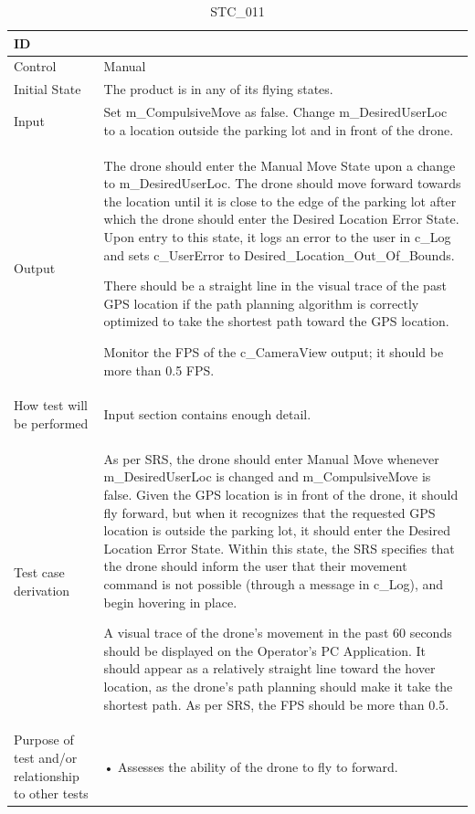 \documentclass[12pt, titlepage]{article}
\begin{document}
\begin{table}[!h]
\begin{center}
\caption {STC\_011}
\label{tab:STC_011}
\begin{tabular}{ | m{1.5cm} | m{15cm} | } 
\hline
ID & \nameref{tab:STC_011} \\ 
\hline
Control & Manual \\ 
\hline
Initial State & The product is in any of its flying states.   \\ 
\hline
Input & Set m\_CompulsiveMove as false. Change m\_DesiredUserLoc to a location outside the parking lot and in front of the drone.  \\ 
\hline
Output & The drone should enter the Manual Move State upon a change to m\_DesiredUserLoc. The drone should move forward towards the location until it is close to the edge of the parking lot after which the drone should enter the Desired Location Error State. Upon entry to this state, it logs an error to the user in c\_Log and sets c\_UserError to Desired\_Location\_Out\_Of\_Bounds. 

There should be a straight line in the visual trace of the past GPS location if the path planning algorithm is correctly optimized to take the shortest path toward the GPS location. 

Monitor the FPS of the c\_CameraView output; it should be more than 0.5 FPS.  \\ 
\hline
How test will be performed & Input section contains enough detail. \\ 
\hline
Test case derivation & As per SRS, the drone should enter Manual Move whenever m\_DesiredUserLoc is changed and m\_CompulsiveMove is false. Given the GPS location is in front of the drone, it should fly forward, but when it recognizes that the requested GPS location is outside the parking lot, it should enter the Desired Location Error State. Within this state, the SRS specifies that the drone should inform the user that their movement command is not possible (through a message in c\_Log), and begin hovering in place.

A visual trace of the drone's movement in the past 60 seconds should be displayed on the Operator's PC Application. It should appear as a relatively straight line toward the hover location, as the drone's path planning should make it take the shortest path. 
As per SRS, the FPS should be more than 0.5.
 \\ 
\hline
Purpose of test and/or relationship to other tests & 
• Assesses the ability of the drone to fly to forward.


\end{tabular}
\end{center}
\end{table}
\end{document}
